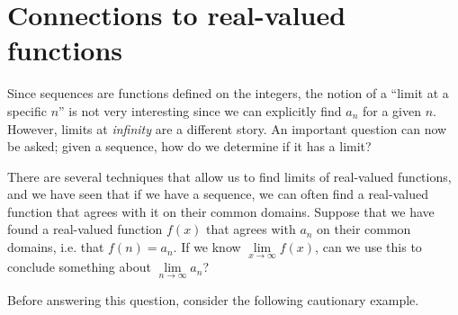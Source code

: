 \documentclass{ximera}
\begin{document}
\section*{Connections to real-valued functions}
Since sequences are functions defined on the integers, the notion of a ``limit at a specific $n$'' is not very interesting since we can explicitly find $a_n$ for a given $n$. However, limits at \textit{infinity} are a different story.  An important question can now be asked; given a sequence, how do we determine if it has a limit?  

There are several techniques that allow us to find limits of real-valued functions, and we have seen that if we have a sequence, we can often find a real-valued function that agrees with it on their common domains.   Suppose that we have found a real-valued function $f(x)$ that agrees with $a_n$ on their common domains, i.e. that $f(n)=a_n$.  If we know  $\lim\limits_{x\to\infty} f(x)$, can we use this to conclude something about $\lim\limits_{n \to \infty} a_n$?  

Before answering this question, consider the following cautionary example.
\end{document}
